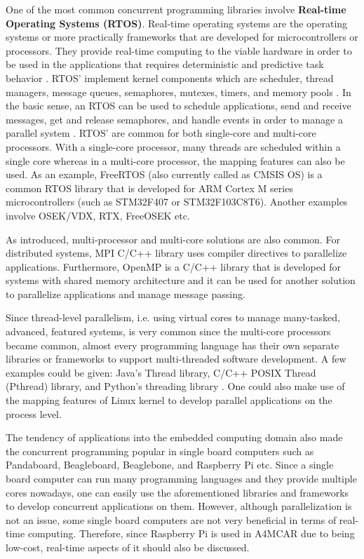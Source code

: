One of the most common concurrent programming libraries involve \textbf{Real-time Operating Systems (RTOS)}.  Real-time operating systems are the operating systems or more practically frameworks that are developed for microcontrollers or processors. They provide real-time computing to the viable hardware in order to be used in the applications that requires deterministic and predictive task behavior \cite{rtos1}. RTOS' implement kernel components which are scheduler, thread managers, message queues, semaphores, mutexes, timers, and memory pools \cite{rtos1}. In the basic sense, an RTOS can be used to schedule applications, send and receive messages, get and release semaphores, and handle events in order to manage a parallel system \cite{rtos1}. RTOS' are common for both single-core and multi-core processors. With a single-core processor, many threads are scheduled within a single core whereas in a multi-core processor, the mapping features can also be used. As an example, FreeRTOS (also currently called as CMSIS OS) is a common RTOS library that is developed for ARM Cortex M series microcontrollers (such as STM32F407 or STM32F103C8T6). Another examples involve OSEK/VDX,  RTX, FreeOSEK etc.

As introduced, multi-processor and multi-core solutions are also common. For distributed systems, MPI C/C++ library uses compiler directives to parallelize applications. Furthermore, OpenMP is a C/C++ library that is developed for systems with shared memory architecture and it can be used for another solution to parallelize applications and manage message passing. 

Since thread-level parallelism, i.e. using virtual cores to manage many-tasked, advanced, featured systems, is very common since the multi-core processors became common, almost every programming language has their own separate libraries or frameworks to support multi-threaded software development. A few examples could be given: Java's Thread library, C/C++ POSIX Thread (Pthread) library, and Python's threading library \cite{pythonthreading}. One could also make use of the mapping features of Linux kernel to develop parallel applications on the process level.

The tendency of applications into the embedded computing domain also made the concurrent programming popular in single board computers such as Pandaboard, Beagleboard, Beaglebone, and Raspberry Pi etc. Since a single board computer can run many programming languages and they provide multiple cores nowadays, one can easily use the aforementioned libraries and frameworks to develop concurrent applications on them. However, although parallelization is not an issue, some single board computers are not very beneficial in terms of real-time computing. Therefore, since Raspberry Pi is used in A4MCAR due to being low-cost, real-time aspects of it should also be discussed.

